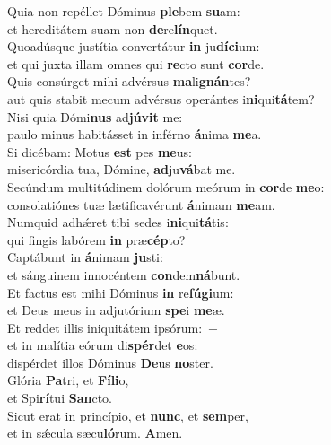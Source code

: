 \evenverse Quia non repéllet Dóminus \textbf{ple}bem \textbf{su}am:~\*\\
\evenverse et hereditátem suam non \textbf{de}re\textbf{lín}quet.\\
\oddverse Quoadúsque justítia convertátur \textbf{in} ju\textbf{dí}\textbf{ci}um:~\*\\
\oddverse et qui juxta illam omnes qui \textbf{re}cto sunt \textbf{cor}de.\\
\evenverse Quis consúrget mihi advérsus \textbf{ma}li\textbf{gnán}tes?~\*\\
\evenverse aut quis stabit mecum advérsus operántes i\textbf{ni}qui\textbf{tá}tem?\\
\oddverse Nisi quia Dómi\textbf{nus} ad\textbf{jú}\textbf{vit} me:~\*\\
\oddverse paulo minus habitásset in inférno \textbf{á}nima \textbf{me}a.\\
\evenverse Si dicébam: Motus \textbf{est} pes \textbf{me}us:~\*\\
\evenverse misericórdia tua, Dómine, \textbf{ad}ju\textbf{vá}bat me.\\
\oddverse Secúndum multitúdinem dolórum meórum in \textbf{cor}de \textbf{me}o:~\*\\
\oddverse consolatiónes tuæ lætificavérunt \textbf{á}nimam \textbf{me}am.\\
\evenverse Numquid adhǽret tibi sedes i\textbf{ni}qui\textbf{tá}tis:~\*\\
\evenverse qui fingis labórem \textbf{in} præ\textbf{cép}to?\\
\oddverse Captábunt in \textbf{á}nimam \textbf{ju}sti:~\*\\
\oddverse et sánguinem innocéntem \textbf{con}dem\textbf{ná}bunt.\\
\evenverse Et factus est mihi Dóminus \textbf{in} re\textbf{fú}\textbf{gi}um:~\*\\
\evenverse et Deus meus in adjutórium \textbf{spe}i \textbf{me}æ.\\
\oddverse Et reddet illis iniquitátem ipsórum:~+\\
\oddverse  et in malítia eórum di\textbf{spér}det \textbf{e}os:~\*\\
\oddverse dispérdet illos Dóminus \textbf{De}us \textbf{no}ster.\\
\evenverse Glória \textbf{Pa}tri, et \textbf{Fí}\textbf{li}o,~\*\\
\evenverse et Spi\textbf{rí}tui \textbf{San}cto.\\
\oddverse Sicut erat in princípio, et \textbf{nunc}, et \textbf{sem}per,~\*\\
\oddverse et in sǽcula sæcu\textbf{ló}rum. \textbf{A}men.\\
